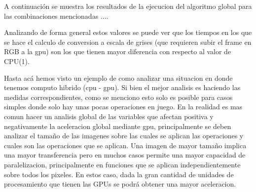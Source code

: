 \documentclass[a4paper,10pt]{report}
\begin{document}
A continuación se muestra los resultados de la ejecucion del algoritmo global para las combinaciones mencionadas ....

\begin{center}
\end{center}





Analizando de forma general estos valores se puede ver que los tiempos en los que se hace el calculo de conversion a escala de grises (que requieren subir el frame en RGB a la gpu) son los que tienen mayor
diferencia con respecto al valor de CPU(1).



Hasta acá hemos visto un ejemplo de como analizar una situacion en donde tenemos computo hibrido (cpu - gpu).
Si bien el mejor analisis es haciendo las medidas correspondientes, como se menciono esto solo es posible para casos simples donde solo hay unas pocas operaciones en juego.
En la realidad es mas comun hacer un analisis global de las variables que afectan positiva y negativamente la aceleracion global mediante gpu, principalmente se deben analizar el tamaño de las imagenes 
sobre las cuales se aplican las operaciones y cuales son las operaciones que se aplican. Una imagen de mayor tamaño implica una mayor transferencia pero en muchos casos permite una mayor capacidad de paralelizacion, 
principalmente en funciones que se aplican independientemente sobre todos los pixeles. En estos caso, dada la gran cantidad de unidades de procesamiento que tienen las GPUs se podrá obtener una mayor aceleracion.
\end{document}
